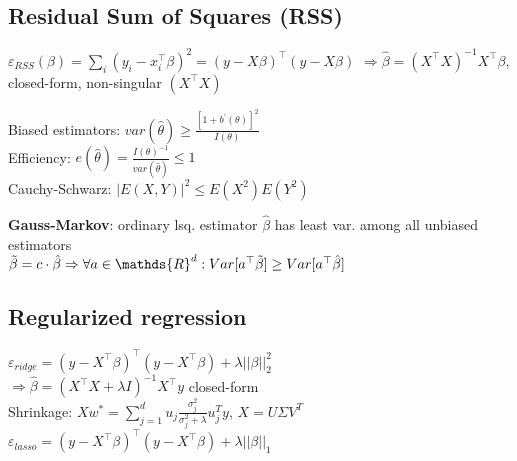\subsection*{Residual Sum of Squares (RSS)}
$\varepsilon_{RSS}(\beta) = \sum_{i} (y_i - x_i^\top \beta)^2 = (y - X\beta)^\top (y - X\beta)$
$\Rightarrow \hat{\beta} = (X^\top X)^{-1} X^\top \beta$, {\tiny closed-form, non-singular $(X^\top X)$}

Biased estimators: $var(\hat{\theta}) \geq \frac{[1 + b^{\prime}(\theta)]^2}{I(\theta)}$ \\
Efficiency: $e(\hat{\theta}) = \frac{I(\theta)^{-1}}{var(\hat{\theta})} \leq 1$ \\
Cauchy-Schwarz: $|E(X,Y)|^2 \leq E(X^2) E(Y^2)$ 

\textbf{Gauss-Markov}: ordinary lsq. estimator $\hat{\beta}$ has least var. among all unbiased estimators \\
$\Tilde{\beta} = c \cdot \hat{\beta} \Rightarrow \forall a \in \mathds{R}^d: Var[a^\top \Tilde{\beta}] \geq Var[a^\top \hat{\beta}]$

\subsection*{Regularized regression}
$\varepsilon_{ridge} = (y - X^\top \beta)^\top (y - X^\top \beta) + \lambda ||\beta||_2^2$ \\
$\Rightarrow \hat{\beta} = (X^\top X + \lambda I)^{-1} X^\top y$ {\tiny closed-form}\\
Shrinkage: $Xw^*{=}\sum_{j=1}^{d} u_j\frac{\sigma_j^2}{\sigma_j^2+\lambda}u_j^Ty$, $X{=}U\Sigma V^T$ 
$\varepsilon_{lasso} = (y - X^\top \beta)^\top (y - X^\top \beta) + \lambda ||\beta||_1$ \\

